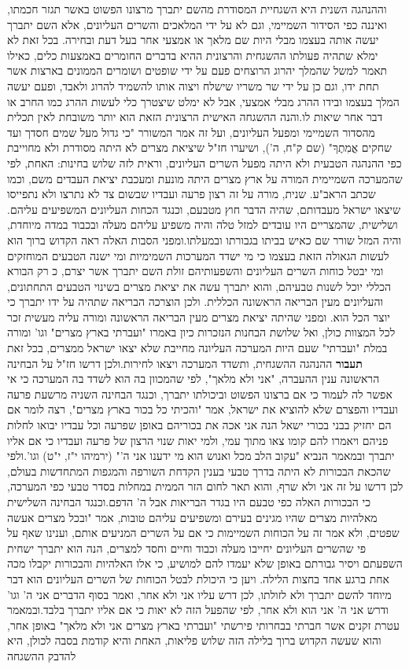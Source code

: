 \documentclass[12pt, openany]{book}
\begin{document}
וההנהגה השנית היא השגחיית המסודרת מהשם יתברך מרצונו הפשוט באשר תגזר חכמתו, ואיננה כפי הסידור השמיימי, וגם לא על ידי המלאכים והשרים העליונים, אלא השם יתברך יעשה אותה בעצמו מבלי היות שם מלאך או אמצעי אחר בעל דעת ובחירה. בכל זאת לא ימלא שתהיה פעולתו ההשגחית והרצונית ההיא בדברים החומרים באמצעות כלים, כאילו תאמר למשל שהמלך יהרוג הרוצחים פעם על ידי שופטים ושומרים הממונים בארצות אשר תחת ידו, וגם כן על ידי שר משריו שישלח ויצוה אותו להשמיד להרוג ולאבד, ופעם יעשה המלך בעצמו ובידו ההרג מבלי אמצעי, אבל לא ימלט שיצטרך כלי לעשות ההרג כמו החרב או דבר אחר שיאות לו.והנה ההשגחה האישית הרצונית הזאת הוא יותר משובחת לאין תכלית מהסדור השמיימי ומפעל העליונים, ועל זה אמר המשורר "כי גדול מעל שמים חסדך ועד שחקים אֳמִתֶךָ" (שם ק"ח, ה'), ושיערו חז"ל שיציאת מצרים לא היתה מסודרת ולא מחוייבת כפי ההנהגה הטבעית ולא היתה מפעל השרים העליונים, וראית לזה שלוש בחינות: האחת, לפי שהמערכה השמיימית המורה על ארץ מצרים היתה מונעת ומעכבת יציאת העבדים משם, וכמו שכתב הראב"ע. שנית, מורה על זה רצון פרעה ועבדיו שבשום צד לא נתרצו ולא נתפייסו שיצאו ישראל מעבדותם, שהיה הדבר חוץ מטבעם, וכנגד הכחות העליונים המשפיעים עליהם. ושלישית, שהמצריים היו עובדים למזל טלה והיה משפיע עליהם מעלה ובכבוד במדה מיוחדת, והיה המזל שורר שם כאיש בביתו בגבורתו ובמעלתו.ומפני הסבות האלה ראה הקדוש ברוך הוא לעשות הגאולה הזאת בעצמו כי מי ישדד המערכות השמימיות ומי ישנה הטבעים המוחזקים ומי יבטל כוחות השרים העליונים והשפעותיהם זולת השם יתברך אשר יצרם, כ רק הבורא הכללי יוכל לשנות טבעיהם, והוא יתברך עשה את יציאת מצרים בשינוי הטבעים התחתונים, והעליונים מעין הבריאה הראשונה הכללית. ולכן הוצרכה הבריאה שתהיה על ידו יתברך כי יוצר הכל הוא. ומפני שהיתה יציאת מצרים מעין הבריאה הראשונה ומורה עליה מעשית זכר לכל המצוות כולן, ואל שלושת הבחנות הנזכרות כיון באמרו "ועברתי בארץ מצרים" וגו' ומורה במלת "ועברתי" שעם היות המערכה העליונה מחייבת שלא יצאו ישראל ממצרים, בכל זאת \textrm{\textbf{תעבור}} ההנהגה ההשגחית, ותשדד המערכה ויצאו לחירות.ולכן דרשו חז"ל על הבחינה הראשונה ענין ההעברה, "אני ולא מלאך", לפי שהמכוון בה הוא לשדד בה המערכה כי אי אפשר לה לעמוד כי אם ברצונו הפשוט וביכולתו יתברך, וכנגד הבחינה השניה מרשעת פרעה ועבדיו והפצרם שלא להוציא את ישראל, אמר "והכיתי כל בכור בארץ מצרים", רצה לומר אם הם יחזיק בבני בכורי ישאל הנה אני אכה את בכוריהם באופן שפרעה וכל עבדיו יבואו לחלות פניהם ויאמרו להם קומו צאו מתוך עמי, ולמי יאות שנוי הרצון של פרעה ועבדיו כי אם אליו יתברך ובמאמר הנביא "עקוב הלב מכל ואנוש הוא מי ידענו אני ה'" (ירמיהו י"ז, י"ט) וגו'.ולפי שהכאת הבכורות לא היתה בדרך טבעי בענין הקדחת השורפה והמגפות המתחדשות בעולם, לכן דרשו על זה אני ולא שרף, והוא תאר לחום הזר הממית במחלות בסדר טבעי כפי המערכה, כי הבכורות האלה כפי טבעם היו בגדר הבריאות אבל ה' הדפם.וכנגד הבחינה השלישית מאלהיות מצרים שהיו מגינים בעירם ומשפיעים עליהם טובות, אמר "ובכל מצרים אעשה שפטים, ולא אמר זה על הכוחות השמיימות כי אם על השרים המניעים אותם, וענינו שאף על פי שהשרים העליונים יחייבו מעלה וכבוד וחיים וחסד למצרים, הנה הוא יתברך ישחית השפעתם ויסיר גבורתם באופן שלא יעמדו להם למושיע, כי אלו האלהיות והבכורות יקבלו מכה אחת ברגע אחד בחצות הלילה. ויען כי היכולת לבטל הכוחות של השרים העליונים הוא דבר מיוחד להשם יתברך ולא לזולתו, לכן דרש עליו אני ולא אחר, ואמר בסוף הדברים אני ה' וגו' ודרש אני ה' אני הוא ולא אחר, לפי שהפעל הזה לא יאות כי אם אליו יתברך בלבד.ובמאמר עטרת זקנים אשר חברתי בבחרותי פירשתי "ועברתי בארץ מצרים אני ולא מלאך" באופן אחר, והוא שעשה הקדוש ברוך בלילה הזה שלוש פליאות, האחת והיא קודמת בסבה לכולן, היא להדבק ההשגחה 
\end{document}
